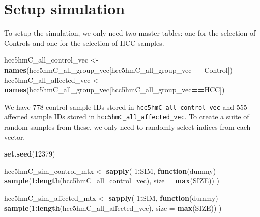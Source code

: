 \documentclass[
]{book}
\newenvironment{Shaded}{\begin{snugshade}}{\end{snugshade}}
\newcommand{\ControlFlowTok}[1]{\textcolor[rgb]{0.13,0.29,0.53}{\textbf{#1}}}
\newcommand{\DataTypeTok}[1]{\textcolor[rgb]{0.13,0.29,0.53}{#1}}
\newcommand{\DecValTok}[1]{\textcolor[rgb]{0.00,0.00,0.81}{#1}}
\newcommand{\KeywordTok}[1]{\textcolor[rgb]{0.13,0.29,0.53}{\textbf{#1}}}
\newcommand{\NormalTok}[1]{#1}
\newcommand{\OperatorTok}[1]{\textcolor[rgb]{0.81,0.36,0.00}{\textbf{#1}}}
\newcommand{\StringTok}[1]{\textcolor[rgb]{0.31,0.60,0.02}{#1}}
\begin{document}
\hypertarget{setup-simulation}{%
\section{Setup simulation}\label{setup-simulation}}

To setup the simulation, we only need two master tables: one for the selection of Controls
and one for the selection of HCC samples.

\begin{Shaded}
\begin{Highlighting}[]
\NormalTok{hcc5hmC\_all\_control\_vec <{-}}\StringTok{ }\KeywordTok{names}\NormalTok{(hcc5hmC\_all\_group\_vec[hcc5hmC\_all\_group\_vec}\OperatorTok{==}\StringTok{\textquotesingle{}Control\textquotesingle{}}\NormalTok{]) }
\NormalTok{hcc5hmC\_all\_affected\_vec <{-}}\StringTok{ }\KeywordTok{names}\NormalTok{(hcc5hmC\_all\_group\_vec[hcc5hmC\_all\_group\_vec}\OperatorTok{==}\StringTok{\textquotesingle{}HCC\textquotesingle{}}\NormalTok{])  }
\end{Highlighting}
\end{Shaded}

We have 778 control sample IDs stored in \texttt{hcc5hmC\_all\_control\_vec}
and 555 affected sample IDs stored in \texttt{hcc5hmC\_all\_affected\_vec}.
To create a suite of random samples from these, we only need to randomly select indices from
each vector.

\begin{Shaded}
\begin{Highlighting}[]
\KeywordTok{set.seed}\NormalTok{(}\DecValTok{12379}\NormalTok{)}

\NormalTok{hcc5hmC\_sim\_control\_mtx <{-}}\StringTok{ }\KeywordTok{sapply}\NormalTok{(}
 \DecValTok{1}\OperatorTok{:}\NormalTok{SIM, }
 \ControlFlowTok{function}\NormalTok{(dummy) }
   \KeywordTok{sample}\NormalTok{(}\DecValTok{1}\OperatorTok{:}\KeywordTok{length}\NormalTok{(hcc5hmC\_all\_control\_vec), }\DataTypeTok{size =}  \KeywordTok{max}\NormalTok{(SIZE))}
\NormalTok{)}


\NormalTok{hcc5hmC\_sim\_affected\_mtx <{-}}\StringTok{ }\KeywordTok{sapply}\NormalTok{(}
 \DecValTok{1}\OperatorTok{:}\NormalTok{SIM, }
 \ControlFlowTok{function}\NormalTok{(dummy) }
   \KeywordTok{sample}\NormalTok{(}\DecValTok{1}\OperatorTok{:}\KeywordTok{length}\NormalTok{(hcc5hmC\_all\_affected\_vec), }\DataTypeTok{size =}  \KeywordTok{max}\NormalTok{(SIZE))}
\NormalTok{)}
\end{Highlighting}
\end{Shaded}
\end{document}
